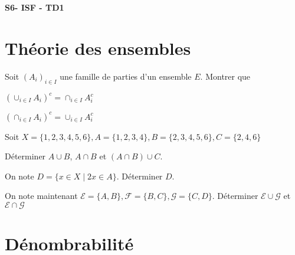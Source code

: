 \documentclass[french]{report}
\begin{document}
\begin{center}
    \huge{\textbf{S6- ISF - TD1}}
\end{center}

\section*{Théorie des ensembles}

\begin{exo}
    Soit \((A_i)_{i\in I}\) une famille de parties d'un ensemble \(E\). Montrer que
    \begin{q}{1}
        \(\left(\cup_{i\in I}A_i\right)^c = \cap_{i\in I} A_i^c\)
    \end{q}
    \begin{q}{2}
        \(\left(\cap_{i\in I}A_i\right)^c = \cup_{i\in I} A_i^c\)
    \end{q}
\end{exo}

\begin{exo}
    Soit \(X=\{1,2,3,4,5,6\}, A=\{1,2,3,4\}, B=\{2,3,4,5,6\}, C=\{2,4,6\}\)
    \begin{q}{1}
        Déterminer \(A\cup B\), \(A\cap B\) et \(\left(A\cap B\right)\cup C\).
    \end{q}
    \begin{q}{2}
        On note \(D=\{x\in X\mid 2x\in A\}\). Déterminer \(D\).
    \end{q}
    \begin{q}{3}
        On note maintenant \(\mathcal{E}=\{A,B\}, \mathcal{F}=\{B,C\}, \mathcal{G}=\{C,D\}.\)
        Déterminer \(\mathcal{E}\cup\mathcal{G}\) et \(\mathcal{E}\cap\mathcal{G}\)
    \end{q}
\end{exo}

\section*{Dénombrabilité}
\end{document}
